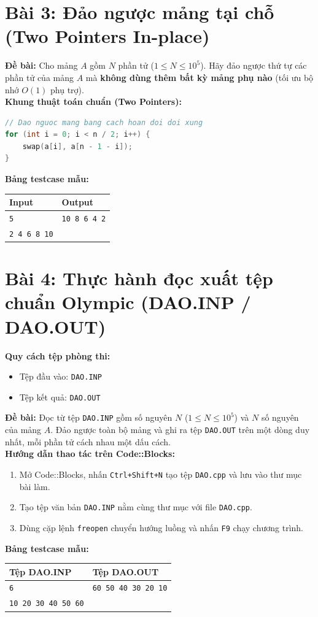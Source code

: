 \documentclass[11pt,a4paper]{article}
\begin{document}
\section*{\color{AsianDarkBlue}Bài 3: Đảo ngược mảng tại chỗ (Two Pointers In-place)}
\textbf{Đề bài:} Cho mảng $A$ gồm $N$ phần tử ($1 \le N \le 10^5$). Hãy đảo ngược thứ tự các phần tử của mảng $A$ mà \textbf{không dùng thêm bất kỳ mảng phụ nào} (tối ưu bộ nhớ $O(1)$ phụ trợ).\\
\textbf{Khung thuật toán chuẩn (Two Pointers):}
\begin{lstlisting}[language=C++]
// Dao nguoc mang bang cach hoan doi doi xung
for (int i = 0; i < n / 2; i++) {
    swap(a[i], a[n - 1 - i]);
}
\end{lstlisting}
\textbf{Bảng testcase mẫu:}
\begin{table}[h!]
\centering\small
\begin{tabular}{|p{7.5cm}|p{7.5cm}|}
\hline
\textbf{Input} & \textbf{Output} \\ \hline
\texttt{5} & \texttt{10 8 6 4 2} \\
\texttt{2 4 6 8 10} & \\ \hline
\end{tabular}
\end{table}

\section*{\color{AsianDarkBlue}Bài 4: Thực hành đọc xuất tệp chuẩn Olympic (DAO.INP / DAO.OUT)}
\textbf{Quy cách tệp phòng thi:}
\begin{itemize}
    \setlength{\itemsep}{1pt}
    \item Tệp đầu vào: \texttt{DAO.INP}
    \item Tệp kết quả: \texttt{DAO.OUT}
\end{itemize}
\textbf{Đề bài:} Đọc từ tệp \texttt{DAO.INP} gồm số nguyên $N$ ($1 \le N \le 10^5$) và $N$ số nguyên của mảng $A$. Đảo ngược toàn bộ mảng và ghi ra tệp \texttt{DAO.OUT} trên một dòng duy nhất, mỗi phần tử cách nhau một dấu cách.\\
\textbf{Hướng dẫn thao tác trên Code::Blocks:}
\begin{enumerate}
    \setlength{\itemsep}{1pt}
    \item Mở Code::Blocks, nhấn \texttt{Ctrl+Shift+N} tạo tệp \texttt{DAO.cpp} và lưu vào thư mục bài làm.
    \item Tạo tệp văn bản \texttt{DAO.INP} nằm cùng thư mục với file \texttt{DAO.cpp}.
    \item Dùng cặp lệnh \texttt{freopen} chuyển hướng luồng và nhấn \texttt{F9} chạy chương trình.
\end{enumerate}
\textbf{Bảng testcase mẫu:}
\begin{table}[h!]
\centering\small
\begin{tabular}{|p{7.5cm}|p{7.5cm}|}
\hline
\textbf{Tệp DAO.INP} & \textbf{Tệp DAO.OUT} \\ \hline
\texttt{6} & \texttt{60 50 40 30 20 10} \\
\texttt{10 20 30 40 50 60} & \\ \hline
\end{tabular}
\end{table}
\end{document}
